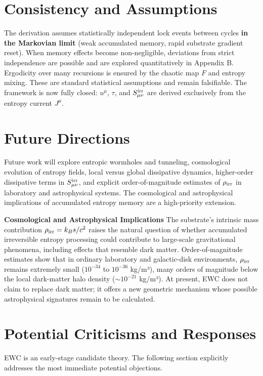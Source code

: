\documentclass[11pt,letterpaper]{article}
\begin{document}
\section{Consistency and Assumptions}
The derivation assumes statistically independent lock events between cycles \textbf{in the Markovian limit} (weak accumulated memory, rapid substrate gradient reset). When memory effects become non-negligible, deviations from strict independence are possible and are explored quantitatively in Appendix B. Ergodicity over many recursions is ensured by the chaotic map \(F\) and entropy mixing. These are standard statistical assumptions and remain falsifiable. The framework is now fully closed: \(u^\mu\), \(\tau\), and \(S_{\mu\nu}^{\rm irr}\) are derived exclusively from the entropy current \(J^\mu\).

\section{Future Directions}
Future work will explore entropic wormholes and tunneling, cosmological evolution of entropy fields, local versus global dissipative dynamics, higher-order dissipative terms in \(S_{\mu\nu}^{\rm irr}\), and explicit order-of-magnitude estimates of \(\rho_{\rm irr}\) in laboratory and astrophysical systems. The cosmological and astrophysical implications of accumulated entropy memory are a high-priority extension.

\textbf{Cosmological and Astrophysical Implications}  
The substrate’s intrinsic mass contribution \(\rho_{\rm irr} = k_B s / c^2\) raises the natural question of whether accumulated irreversible entropy processing could contribute to large-scale gravitational phenomena, including effects that resemble dark matter. Order-of-magnitude estimates show that in ordinary laboratory and galactic-disk environments, \(\rho_{\rm irr}\) remains extremely small (\(10^{-34}\) to \(10^{-36}\) kg/m³), many orders of magnitude below the local dark-matter halo density (\(\sim 10^{-21}\) kg/m³). At present, EWC does not claim to replace dark matter; it offers a new geometric mechanism whose possible astrophysical signatures remain to be calculated.

\section{Potential Criticisms and Responses}
EWC is an early-stage candidate theory. The following section explicitly addresses the most immediate potential objections.
\end{document}
